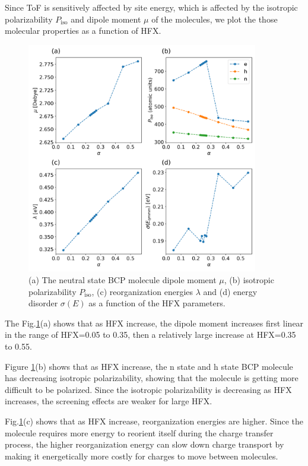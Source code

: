 \documentclass[letterpaper,12pt]{article}
\begin{document}
Since ToF is sensitively affected by site energy, which is affected by the isotropic polarizability $P_\text{iso}$ and dipole moment $\mu$ of the molecules, we plot the those molecular properties as a function of HFX. 
\begin{figure}[h]
    \centering
    \includegraphics[width=0.9\textwidth]{figs/BCP_HFX/fig_autogen_BCP.png}
    \caption{(a) The neutral state BCP molecule dipole moment $\mu$, (b) isotropic polarizability $P_\text{iso}$, (c) reorganization energies $\lambda$ and (d) energy disorder $\sigma(E)$ as a function of the HFX parameters. }
    \label{fig:autogen}
\end{figure}
The Fig.\ref{fig:autogen}(a) shows that as HFX increase, the dipole moment increases first linear in the range of HFX=0.05 to 0.35, then a relatively large increase at HFX=0.35 to 0.55.
 
Figure \ref{fig:autogen}(b) shows that as HFX increase, the n state and h state BCP molecule has decreasing isotropic polarizability, showing that the molecule is getting more difficult to be polarized. 
Since the isotropic polarizability is decreasing as HFX increases, the screening effects are weaker for large HFX. 

Fig.\ref{fig:autogen}(c) shows that as HFX increase, reorganization energies are higher. Since the molecule requires more energy to reorient itself during the charge transfer process, the higher reorganization energy can slow down charge transport by making it energetically more costly for charges to move between molecules.
\end{document}
